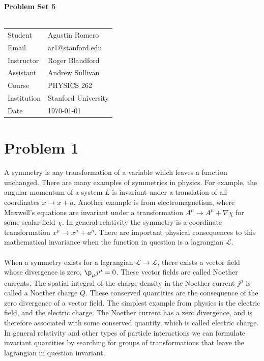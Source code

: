 \documentclass{article}
\begin{document}
\begin{center}
\textbf{\Large{Problem Set 5}}\\~\\
\begin{tabular}{l l}
Student&Agustin Romero\\
Email&ar1@stanford.edu\\
Instructor&Roger Blandford\\
Assistant&Andrew Sullivan\\
Course&PHYSICS 262\\
Institution&Stanford University\\
Date&\today\\
\end{tabular}
\end{center}
\section*{Problem 1}
A symmetry is any transformation of a variable which leaves a function unchanged. There are many examples of symmetries in physics. For example, the angular momentum of a system $L$ is invariant under a translation of all coordinates $x\rightarrow x+a$. Another example is from electromagnetism, where Maxwell's equations are invariant under a transformation $A^\mu \rightarrow A^\mu + \nabla \chi$ for some scalar field $\chi$. In general relativity the symmetry is a coordinate transformation $x^\mu \rightarrow x^\mu + a^\mu$. There are important physical consequences to this mathematical invariance when the function in question is a lagrangian $\mathcal{L}$.\\~\\
When a symmetry exists for a lagrangian $\mathcal{L}\rightarrow \mathcal{L}$, there exists a vector field whose divergence is zero, $\p_\mu j^\mu=0$. These vector fields are called Noether currents. The spatial integral of the charge density in the Noether current $j^\mu$ is called a Noether charge $Q$. These conserved quantities are the consequence of the zero divergence of a vector field. The simplest example from physics is the electric field, and the electric charge. The Noether current has a zero divergence, and is therefore associated with some conserved quantity, which is called electric charge. In general relativity and other types of particle interactions we can formulate invariant quantities by searching for groups of transformations that leave the lagrangian in question invariant.
\end{document}
